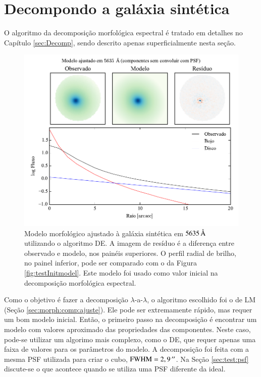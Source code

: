\section{Decompondo a galáxia sintética}

O algoritmo da decomposição morfológica espectral é tratado em detalhes no
Capítulo \ref{sec:Decomp}, sendo descrito apenas superficialmente nesta seção.

\begin{figure}
	\includegraphics{figuras/simulation_fitmodel}
	\caption[Modelo morfológico inicial do ajuste da galáxia sintética.]
	{Modelo morfológico ajustado à galáxia sintética em $5635\,\text{\normalfont\AA}$
	utilizando o algoritmo DE. A imagem de resíduo é a diferença entre
	observado e modelo, nos painéis superiores. O perfil radial de brilho, no
	painel inferior, pode ser comparado com o da Figura \ref{fig:testInitmodel}.
	Este modelo foi usado como valor inicial na decomposição morfológica
	espectral.}
	\label{fig:testFitmodel}
\end{figure}

Como o objetivo é fazer a decomposição $\lambda$-a-$\lambda$, o algoritmo
escolhido foi o de LM (Seção \ref{sec:morph:comp:ajuste}). Ele pode ser
extremamente rápido, mas requer um bom modelo inicial. Então, o primeiro passo
na decomposição é encontrar um modelo com valores aproximado das propriedades
das componentes. Neste caso, pode-se utilizar um algorimo mais complexo, como o
DE, que requer apenas uma faixa de valores para os parâmetros do modelo.
A decomposição foi feita com a mesma PSF utilizada para criar o cubo,
$\mathrm{FWHM} = 2,9\,^{\prime\prime}$. Na Seção \ref{sec:test:psf} discute-se o que
acontece quando se utiliza uma PSF diferente da ideal.

